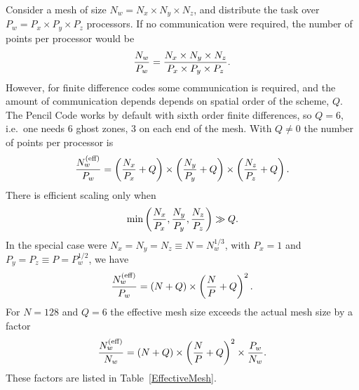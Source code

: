 \documentclass[\mydriver,12pt,twoside,notitlepage,a4paper]{article}
\begin{document}
Consider a mesh of size $N_w=N_x\times N_y\times N_z$,
and distribute the task over $P_w=P_x\times P_y\times P_z$ processors.
If no communication were required, the number of points per processor
would be
\begin{equation}
{N_w\over P_w}={N_x\times N_y\times N_z\over P_x\times P_y\times P_z}.
\end{equation}
However, for finite difference codes some communication is required,
and the amount of communication depends depends on spatial order of the
scheme, $Q$.
The {\sc Pencil Code} works by default with sixth order finite differences,
so $Q=6$, i.e.\ one needs 6 ghost zones, 3 on each end of the mesh.
With $Q\neq0$ the number of points per processor is
\begin{equation}
{N_w^{\rm(eff)}\over P_w}=
\left({N_x\over P_x}+Q\right)\times
\left({N_y\over P_y}+Q\right)\times
\left({N_z\over P_z}+Q\right).
\end{equation}
There is efficient scaling only when
\begin{equation}
\min\left({N_x\over P_x}, {N_y\over P_y}, {N_z\over P_z}\right)\gg Q.
\end{equation}
In the special case were $N_x=N_y=N_z\equiv N=N_w^{1/3}$,
with $P_x=1$ and $P_y=P_z\equiv P=P_w^{1/2}$, we have 
\begin{equation}
{N_w^{\rm(eff)}\over P_w}=
\left(N+Q\right)\times
\left({N\over P}+Q\right)^2.
\end{equation}
For $N=128$ and $Q=6$ the effective mesh size exceeds the actual mesh
size by a factor
\begin{equation}
{N_w^{\rm(eff)}\over N_w}
=\left(N+Q\right)\times\left({N\over P}+Q\right)^2\times{P_w\over N_w}.
\end{equation}
These factors are listed in Table~\ref{EffectiveMesh}.
\end{document}
